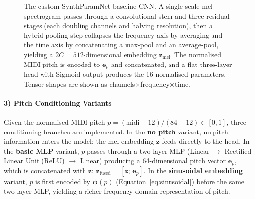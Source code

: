 \begin{figure}[H]
{%
}
\vspace{0.3cm}
\caption{The custom SynthParamNet baseline CNN. A single-scale mel spectrogram passes through a convolutional stem and three residual stages (each doubling channels and halving resolution), then a hybrid pooling step collapses the frequency axis by averaging and the time axis by concatenating a max-pool and an average-pool, yielding a $2C\!=\!512$-dimensional embedding $\mathbf{z}_{\text{mel}}$. The normalised MIDI pitch is encoded to $\mathbf{e}_p$ and concatenated, and a flat three-layer head with Sigmoid output produces the 16 normalised parameters. Tensor shapes are shown as channels$\times$frequency$\times$time.}
\label{fig:baseline_cnn}
\end{figure}

\paragraph{3) Pitch Conditioning Variants}
Given the normalised MIDI pitch $p = (\text{midi} - 12) / (84 - 12) \in [0,1]$, three conditioning branches are implemented.
In the \textbf{no-pitch} variant, no pitch information enters the model; the mel embedding $\mathbf{z}$ feeds directly to the head.
In the \textbf{basic MLP} variant, $p$ passes through a two-layer MLP (Linear $\to$ Rectified Linear Unit (ReLU) $\to$ Linear) producing a 64-dimensional pitch vector $\mathbf{e}_p$, which is concatenated with $\mathbf{z}$: $\mathbf{z}_{\text{fused}} = [\mathbf{z};\, \mathbf{e}_p]$.
In the \textbf{sinusoidal embedding} variant, $p$ is first encoded by $\boldsymbol{\phi}(p)$ (Equation~\ref{eq:sinusoidal}) before the same two-layer MLP, yielding a richer frequency-domain representation of pitch.

